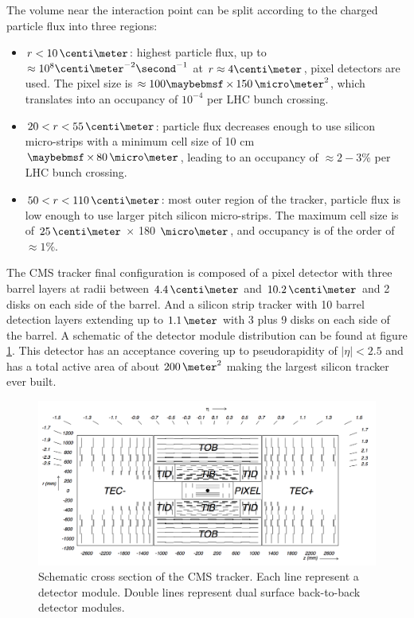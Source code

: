 The volume near the interaction point can be split according to the charged particle flux into three regions:

\begin{itemize}
  \item $r<10\,\centi\meter$: highest particle flux, up to $\approx 10^8 \centi\meter^{-2}\second^{-1}$ at $r \approx 4 \centi\meter$, pixel detectors are used. The pixel size is $\approx 100 \times 150\,\micro\meter^2$, which translates into an occupancy of $10^{-4}$ per \gls{LHC} bunch crossing.
  \item $20<r<55\,\centi\meter$: particle flux decreases enough to use silicon micro-strips with a minimum cell size of 10 cm $\times 80\,\micro\meter$, leading to an occupancy of $\approx 2-3\%$ per \gls{LHC} bunch crossing.
  \item $50<r<110\,\centi\meter$: most outer region of the tracker, particle flux is low enough to use larger pitch silicon micro-strips. The maximum cell size is of $25\,\centi\meter$ $\times$ 180 $\micro\meter$, and occupancy is of the order of $\approx 1\%$.
\end{itemize}

The \gls{CMS} tracker final configuration is composed of a pixel detector with three barrel layers at radii between $4.4\,\centi\meter$ and $10.2\,\centi\meter$ and 2 disks on each side of the barrel. And a silicon strip tracker with 10 barrel detection layers extending up to $1.1\,\meter$ with 3 plus 9 disks on each side of the barrel. A schematic of the detector module distribution can be found at figure \ref{FIGURE:ExperimentalApparatus_CMS_Tracker_Layout}. This detector has an acceptance covering up to pseudorapidity of $|\eta|<2.5$ and has a total active area of about $200\,\meter^2$ making the largest silicon tracker ever built. 

\begin{figure}[!htb]
  \centering
  \includegraphics[width=1.0\textwidth]{Chapter02/CMS/Images/CMS_Tracker_Layout.png}
  \caption{Schematic cross section of the CMS tracker. Each line represent a detector module. Double lines represent dual surface back-to-back detector modules.}
  \label{FIGURE:ExperimentalApparatus_CMS_Tracker_Layout}
\end{figure}

